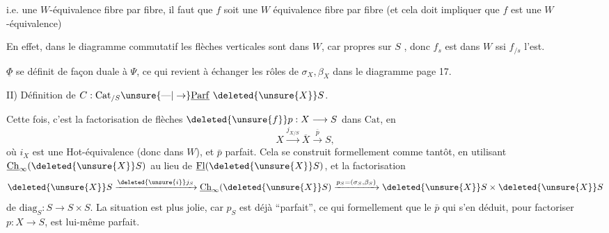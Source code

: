 
i.e. une $W$-équivalence fibre par fibre, il faut  que $f$ soit une $W$ équivalence fibre par fibre (et cela doit impliquer  que $f$ est une $W$-équivalence)

En effet, dans le diagramme commutatif
les flèches verticales sont dans $W$, car   propres sur $S$ , donc $f_s$ est dans $W$ ssi $f_{/s}$ l'est.

$\underline{\Phi}$ se définit de façon duale à $\Psi$, ce qui revient à échanger les rôles de $\sigma_X,\beta_X$ dans le diagramme page 17.

II) Définition de  $C:\mathrm{Cat}_{/S}\unsure{\text{---}|\to}\underline{\mathrm{Parf}}\ \deleted{\unsure{X}}S$.

Cette fois, c'est la factorisation de  flèches $\deleted{\unsure{f}}p:X\longrightarrow S$ dans $\mathrm{Cat}$, en
\[ X\xrightarrow{j_{X/S}}\overline{X}\xrightarrow{\bar p} S, \]
où $i_X$ est une Hot-équivalence (donc dans $W$), et $\bar p$ parfait. Cela se construit formellement comme tantôt, en utilisant $\underline{\mathrm{Ch}}_\infty(\deleted{\unsure{X}}S)$ au lieu de $\underline{\mathrm{Fl}}(\deleted{\unsure{X}}S)$, et la factorisation
\[ \deleted{\unsure{X}}S\xrightarrow{\deleted{\unsure{i}}j_S}\underline{\mathrm{Ch}}_\infty(\deleted{\unsure{X}}S)\xrightarrow{p_S=(\sigma_S,\beta_S)}\deleted{\unsure{X}}S\times\deleted{\unsure{X}}S \]
de $\mathrm{diag}_S:S\longrightarrow S\times S$. La situation est plus jolie, car $p_S$ est déjà ``parfait'', ce qui  formellement que le $\bar p$ qui s'en déduit, pour factoriser $p:X\longrightarrow S$, est lui-même parfait.

